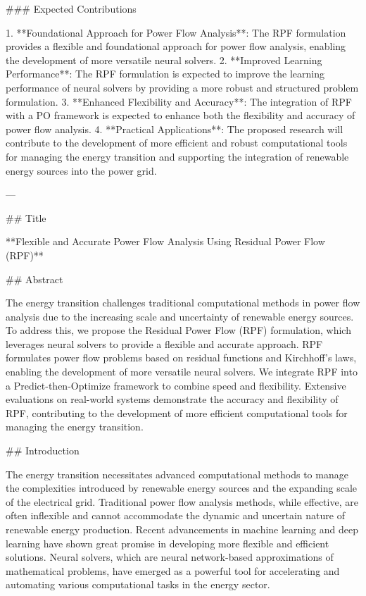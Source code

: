 ### Expected Contributions

1. **Foundational Approach for Power Flow Analysis**: The RPF formulation provides a flexible and foundational approach for power flow analysis, enabling the development of more versatile neural solvers.
2. **Improved Learning Performance**: The RPF formulation is expected to improve the learning performance of neural solvers by providing a more robust and structured problem formulation.
3. **Enhanced Flexibility and Accuracy**: The integration of RPF with a PO framework is expected to enhance both the flexibility and accuracy of power flow analysis.
4. **Practical Applications**: The proposed research will contribute to the development of more efficient and robust computational tools for managing the energy transition and supporting the integration of renewable energy sources into the power grid.

---

## Title

**Flexible and Accurate Power Flow Analysis Using Residual Power Flow (RPF)**

## Abstract

The energy transition challenges traditional computational methods in power flow analysis due to the increasing scale and uncertainty of renewable energy sources. To address this, we propose the Residual Power Flow (RPF) formulation, which leverages neural solvers to provide a flexible and accurate approach. RPF formulates power flow problems based on residual functions and Kirchhoff's laws, enabling the development of more versatile neural solvers. We integrate RPF into a Predict-then-Optimize framework to combine speed and flexibility. Extensive evaluations on real-world systems demonstrate the accuracy and flexibility of RPF, contributing to the development of more efficient computational tools for managing the energy transition.

## Introduction

The energy transition necessitates advanced computational methods to manage the complexities introduced by renewable energy sources and the expanding scale of the electrical grid. Traditional power flow analysis methods, while effective, are often inflexible and cannot accommodate the dynamic and uncertain nature of renewable energy production. Recent advancements in machine learning and deep learning have shown great promise in developing more flexible and efficient solutions. Neural solvers, which are neural network-based approximations of mathematical problems, have emerged as a powerful tool for accelerating and automating various computational tasks in the energy sector.

